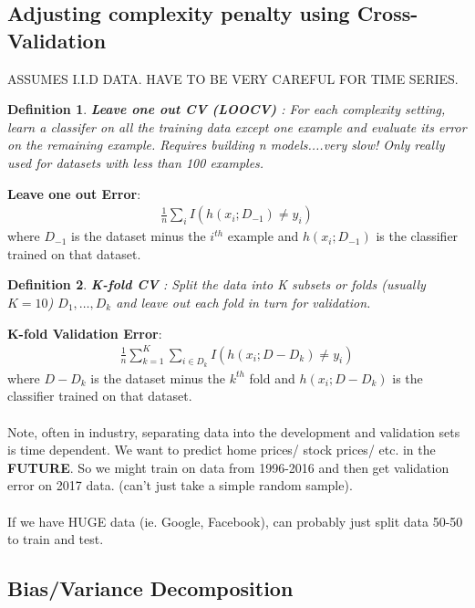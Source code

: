 \documentclass[a4paper]{article}\usepackage[]{graphicx}\usepackage[]{color}
\newtheorem{defn}{Definition}[section]
\begin{document}
\subsection{Adjusting complexity penalty using \textbf{Cross-Validation}}

ASSUMES I.I.D DATA. HAVE TO BE VERY CAREFUL FOR TIME SERIES.

\begin{defn}
\textbf{Leave one out CV (LOOCV)} : For each complexity setting, learn a classifer on \emph{all the training data except one example} and evaluate its error on the remaining example. Requires building n models....very slow! Only really used for datasets with less than 100 examples. 
\end{defn}

\textbf{Leave one out Error}:
\begin{align*}
\frac{1}{n} \sum_i I(h(x_i;D_{-1})\neq y_i)
\end{align*}
where $D_{-1}$ is the dataset minus the $i^{th}$ example and $h(x_i;D_{-1})$ is the classifier trained on that dataset. 

\begin{defn}
\textbf{K-fold CV} : Split the data into K subsets or folds (usually $K=10$) $D_1,\ldots,D_k$ and leave out each fold in turn for validation. 
\end{defn}

\textbf{K-fold Validation Error}:
\begin{align*}
\frac{1}{n}\sum_{k=1}^K \sum_{i \in D_k} I(h(x_i;D-D_k)\neq y_i)
\end{align*}
where $D-D_k$ is the dataset minus the $k^{th}$ fold and $h(x_i;D-D_k)$ is the classifier trained on that dataset. \\
\\
Note, often in industry, separating data into the development and validation sets is time dependent. We want to predict home prices/ stock prices/ etc. in the \textbf{FUTURE}. So we might train on data from 1996-2016 and then get validation error on 2017 data. (can't just take a simple random sample). \\
\\
If we have HUGE data (ie. Google, Facebook), can probably just split data 50-50 to train and test. 

\subsection{Bias/Variance Decomposition}
\end{document}
